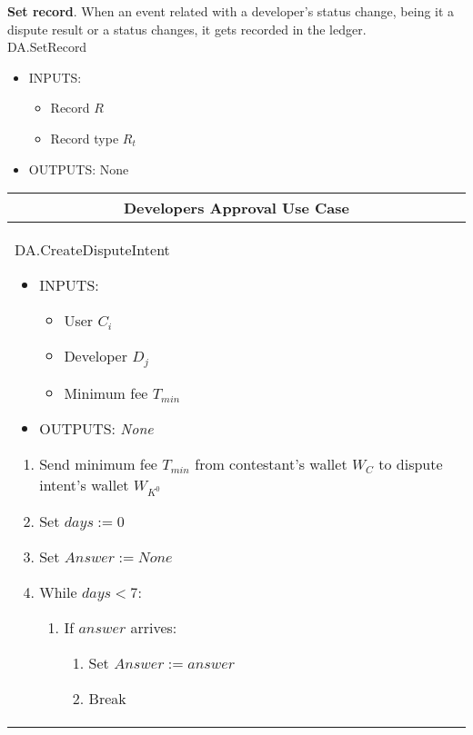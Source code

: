 \noindent \textbf{Set record}. When an event related with a developer's status change, being it a dispute result or a status changes, it gets recorded in the ledger. \\

\textsf{DA.SetRecord}
\begin{itemize}
	\item INPUTS:
	\begin{itemize}
		\item Record $R$
		\item Record type $R_t$
	\end{itemize}
	\item OUTPUTS: None
\end{itemize}

\begin{table}[H]
\scriptsize
\centering
\begin{tabular}{|p{}p{}|}
\hline
\multicolumn{2}{|c|}{Developers Approval Use Case} \\
\hline \vspace{0.1cm}
\textsf{DA.CreateDisputeIntent}
\vspace{-0.3cm}
\begin{itemize}
	\item INPUTS:
	\vspace{-0.4cm}
	\begin{itemize}
		\item User $C_i$
		\item Developer $D_j$
		\item Minimum fee $T_{min}$
	\end{itemize}
	\item OUTPUTS: \textit{None}
\end{itemize}
\begin{enumerate}
	\item Send minimum fee $T_{min}$ from contestant's wallet $W_C$ to dispute intent's wallet $W_{K^0}$
	\item Set $days := 0$
	\item Set $Answer := None$
	\item While $days < 7$:
	\begin{enumerate}
		\item If $answer$ arrives:
		\begin{enumerate}
			\item Set $Answer := answer$
			\item Break
		\end{enumerate}
	\end{enumerate}

\end{enumerate}
\end{tabular}
\end{table}
